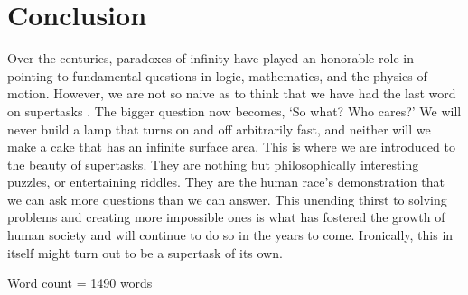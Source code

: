 \documentclass{article}
\begin{document}
\section{Conclusion}
Over the centuries, paradoxes of infinity have played an honorable role in pointing to fundamental questions in logic, mathematics, and the physics of motion. However, we are not so naive as to think that we have had the last word on supertasks \cite{Earman-Norton}. The bigger question now becomes, ‘So what? Who cares?’ We will never build a lamp that turns on and off arbitrarily fast, and neither will we make a cake that has an infinite surface area. This is where we are introduced to the beauty of supertasks. They are nothing but philosophically interesting puzzles, or entertaining riddles. They are the human race’s demonstration that we can ask more questions than we can answer. This unending thirst to solving problems and creating more impossible ones is what has fostered the growth of human society and will continue to do so in the years to come. Ironically, this in itself might turn out to be a supertask of its own.




\vspace{10mm}

Word count = 1490 words
\end{document}
